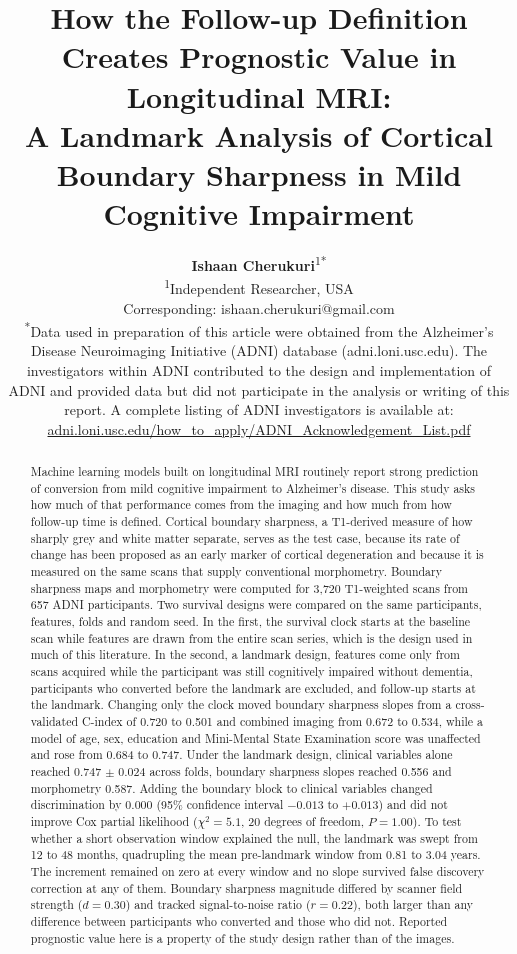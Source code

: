 \documentclass[blue]{ludusofficial}
\title{How the Follow-up Definition Creates Prognostic Value in Longitudinal MRI:\\[8pt]A Landmark Analysis of Cortical Boundary Sharpness in Mild Cognitive Impairment}
\author{%
    \textbf{Ishaan Cherukuri}\textsuperscript{1}\textsuperscript{*}\\[0.2cm]
    \small\textsuperscript{1}Independent Researcher, USA\\
    \small Corresponding: ishaan.cherukuri@gmail.com\\[0.4cm]
    \small\textsuperscript{*}Data used in preparation of this article were obtained from the Alzheimer's Disease Neuroimaging Initiative (ADNI) database (adni.loni.usc.edu). The investigators within ADNI contributed to the design and implementation of ADNI and provided data but did not participate in the analysis or writing of this report. A complete listing of ADNI investigators is available at: \href{http://adni.loni.usc.edu/wp-content/uploads/how_to_apply/ADNI_Acknowledgement_List.pdf}{adni.loni.usc.edu/how\_to\_apply/ADNI\_Acknowledgement\_List.pdf}
}
\begin{document}
\begin{abstract}
Machine learning models built on longitudinal MRI routinely report strong prediction of conversion from mild cognitive impairment to Alzheimer's disease. This study asks how much of that performance comes from the imaging and how much from how follow-up time is defined. Cortical boundary sharpness, a T1-derived measure of how sharply grey and white matter separate, serves as the test case, because its rate of change has been proposed as an early marker of cortical degeneration and because it is measured on the same scans that supply conventional morphometry. Boundary sharpness maps and morphometry were computed for 3{,}720 T1-weighted scans from 657 ADNI participants. Two survival designs were compared on the same participants, features, folds and random seed. In the first, the survival clock starts at the baseline scan while features are drawn from the entire scan series, which is the design used in much of this literature. In the second, a landmark design, features come only from scans acquired while the participant was still cognitively impaired without dementia, participants who converted before the landmark are excluded, and follow-up starts at the landmark. Changing only the clock moved boundary sharpness slopes from a cross-validated C-index of 0.720 to 0.501 and combined imaging from 0.672 to 0.534, while a model of age, sex, education and Mini-Mental State Examination score was unaffected and rose from 0.684 to 0.747. Under the landmark design, clinical variables alone reached 0.747 $\pm$ 0.024 across folds, boundary sharpness slopes reached 0.556 and morphometry 0.587. Adding the boundary block to clinical variables changed discrimination by 0.000 (95\% confidence interval $-0.013$ to $+0.013$) and did not improve Cox partial likelihood ($\chi^2 = 5.1$, 20 degrees of freedom, $P = 1.00$). To test whether a short observation window explained the null, the landmark was swept from 12 to 48 months, quadrupling the mean pre-landmark window from 0.81 to 3.04 years. The increment remained on zero at every window and no slope survived false discovery correction at any of them. Boundary sharpness magnitude differed by scanner field strength ($d = 0.30$) and tracked signal-to-noise ratio ($r = 0.22$), both larger than any difference between participants who converted and those who did not. Reported prognostic value here is a property of the study design rather than of the images.
\end{abstract}

\end{document}
